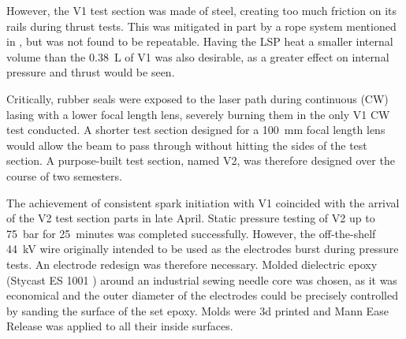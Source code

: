 However, the V1 test section was made of steel, creating too much friction on its rails during thrust tests. This was mitigated in part by a rope system mentioned in \textcite{duplayArgonLaserPlasmaThruster2024a}, but was not found to be repeatable. Having the LSP heat a smaller internal volume than the \qty{0.38}{L} of V1 was also desirable, as a greater effect on internal pressure and thrust would be seen.

Critically, rubber seals were exposed to the laser path during continuous (CW) lasing with a lower focal length lens, severely burning them in the only V1 CW test conducted. A shorter test section designed for a \qty{100}{mm} focal length lens would allow the beam to pass through without hitting the sides of the test section. A purpose-built test section, named V2, was therefore designed over the course of two semesters. 

The achievement of consistent spark initiation with V1 coincided with the arrival of the V2 test section parts in late April. Static pressure testing of V2 up to \qty{75}{bar} for \qty{25}{minutes} was completed successfully. However, the off-the-shelf \qty{44}{kV} wire originally intended to be used as the electrodes burst during pressure tests. An electrode redesign was therefore necessary. Molded dielectric epoxy (Stycast ES 1001 \textcite{McMasterCarr}) around an industrial sewing needle core was chosen, as it was economical and the outer diameter of the electrodes could be precisely controlled by sanding the surface of the set epoxy. Molds were 3d printed and Mann Ease Release was applied to all their inside surfaces.

